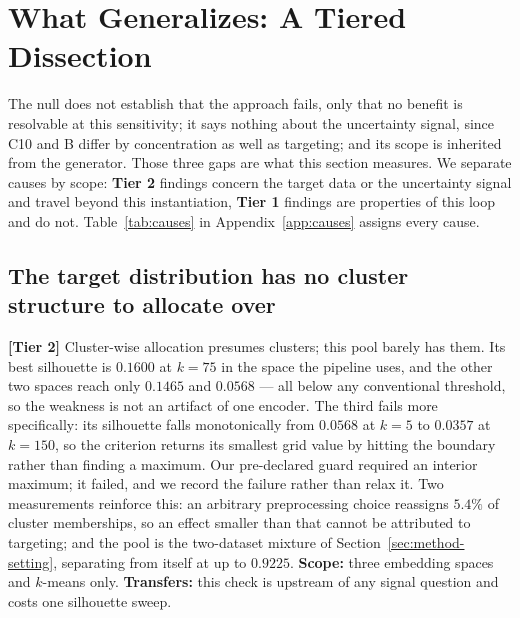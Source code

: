 \documentclass{article} %
\begin{document}
\section{What Generalizes: A Tiered Dissection}
\label{sec:dissection}

The null does not establish that the approach fails, only that no benefit is resolvable at this
sensitivity; it says nothing about the uncertainty signal, since C10 and B differ by concentration as
well as targeting; and its scope is inherited from the generator. Those three gaps are what this
section measures. We separate causes by scope: \textbf{Tier 2} findings concern the target data or the
uncertainty signal and travel beyond this instantiation, \textbf{Tier 1} findings are properties of
this loop and do not. Table~\ref{tab:causes} in Appendix~\ref{app:causes} assigns every cause.

\subsection{The target distribution has no cluster structure to allocate over}
\label{sec:diss-structure}

\textbf{[Tier 2]} Cluster-wise allocation presumes clusters; this pool barely has them. Its best
silhouette is $0.1600$ at $k = 75$ in the space the pipeline uses, and the other two spaces reach only
$0.1465$ and $0.0568$ --- all below any conventional threshold, so the weakness is not an artifact of
one encoder. The third fails more specifically: its silhouette falls monotonically from $0.0568$ at
$k=5$ to $0.0357$ at $k=150$, so the criterion returns its smallest grid value by hitting the boundary
rather than finding a maximum. Our pre-declared guard required an interior maximum; it failed, and we
record the failure rather than relax it. Two measurements reinforce this: an arbitrary preprocessing
choice reassigns $5.4\%$ of cluster memberships, so an effect smaller than that cannot be attributed
to targeting; and the pool is the two-dataset mixture of Section~\ref{sec:method-setting}, separating
from itself at up to $0.9225$. \textbf{Scope:} three embedding spaces and $k$-means only.
\textbf{Transfers:} this check is upstream of any signal question and costs one silhouette sweep.
\end{document}
